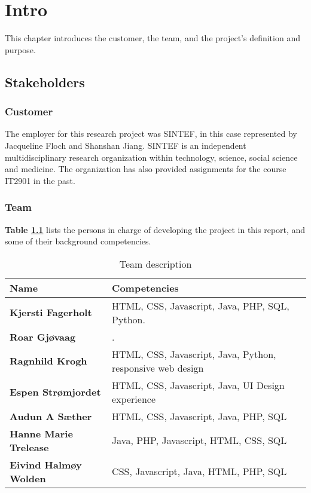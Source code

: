 
\chapter{Intro}

This chapter introduces the customer, the team, and the project's definition and purpose.

\section{Stakeholders}

\subsection{Customer}

The employer for this research project was SINTEF, in this case represented by Jacqueline Floch and Shanshan Jiang. SINTEF is an independent multidisciplinary research organization within technology, science, social science and medicine. The organization has also provided assignments for the course IT2901 in the past.

\subsection{Team}

\textbf{Table \ref{Tab:team}} lists the persons in charge of developing the project in this report, and some of their background competencies.

\begin{table}[!h]
	\begin{center}
		\begin{tabular}{  l  l }
			\textbf{Name} & \textbf{Competencies} \\ \hline
			\textbf{Kjersti Fagerholt} & HTML, CSS, Javascript, Java, PHP, SQL, Python. \\ 
			\textbf{Roar Gjøvaag} & . \\ 
			\textbf{Ragnhild Krogh} & HTML, CSS, Javascript, Java, Python, responsive web design \\ 
			\textbf{Espen Strømjordet} & HTML, CSS, Javascript, Java,
			UI Design experience \\ 
			\textbf{Audun A Sæther} & HTML, CSS, Javascript, Java, PHP, SQL \\ 
			\textbf{Hanne Marie Trelease} & Java, PHP, Javascript, HTML, CSS, SQL \\ 
			\textbf{Eivind Halmøy Wolden} & CSS, Javascript, Java, HTML, PHP, SQL \\ 
		\end{tabular}
	\end{center}
	\caption{Team description}
	\label{Tab:team}
\end{table}

